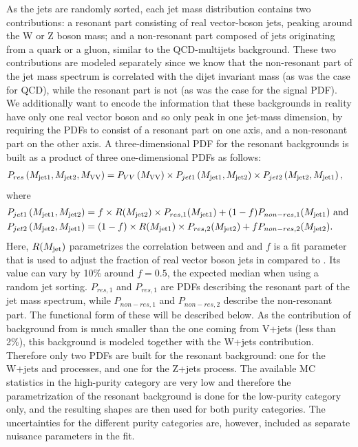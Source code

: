 As the jets are randomly sorted, each jet mass distribution contains two contributions: a resonant part consisting of real vector-boson jets, peaking around the W or Z boson mass; and a non-resonant part composed of jets originating from a quark or a gluon, similar to the QCD-multijets background. These two contributions are modeled separately since we know that the non-resonant part of the jet mass spectrum is correlated with the dijet invariant mass (as was the case for QCD), while the resonant part is not (as was the case for the signal PDF). We additionally want to encode the information that these backgrounds in reality have only one real vector boson and so only peak in one jet-mass dimension, by requiring the PDFs to consist of a resonant part on one axis, and a non-resonant part on the other axis. A three-dimensional PDF for the resonant backgrounds is built as a product of three one-dimensional PDFs as follows:
\begin{align}
	\label{eq:searchIII:vjetpdf}
	P_{res} \left(M_{\rm jet1}, M_{\rm jet2}, M_{\rm VV} \right) &= P_{VV} \left( M_{\rm VV} \right) \times  P_{jet1} \left( M_{\rm jet1}, M_{\rm jet2} \right) \times P_{jet2} \left( M_{\rm jet2}, M_{\rm jet1} \right),
\end{align}
where
\begin{align}
P_{jet1} \left( M_{\rm jet1}, M_{\rm jet2} \right) &= f \times R(M_{\rm jet2}) \times P_{res,1} ( M_{\rm jet1} ) + (1-f) P_{non-res,1} (M_{\rm jet1} )\textrm{ and } \\
P_{jet2} \left( M_{\rm jet2}, M_{\rm jet1} \right) &= (1-f) \times R(M_{\rm jet1}) \times P_{res,2} ( M_{\rm jet2} ) + f P_{non-res,2} (M_{\rm jet2} ).
\end{align}
Here, $R(M_{\rm jet})$ parametrizes the correlation between \MJO and \MJT and $f$ is a fit parameter that is used to adjust the fraction of real vector boson jets in
\MJO compared to \MJT. Its value can vary by 10\% around $f=0.5$, the expected median when using a random jet sorting. $P_{res,1}$ and $P_{res,1}$ are PDFs describing the resonant part of the jet mass spectrum, while $P_{non-res,1}$ and $P_{non-res,2}$ describe the non-resonant part. The functional form of these will be described below. \newline
As the contribution of background from \ttbar is much smaller than the one coming from V+jets (less than 2\%), this background is modeled together with the W+jets contribution. Therefore only two PDFs are built for the resonant background: one for the W+jets and \ttbar processes, and one for the Z+jets process.\newline
The available MC statistics in the high-purity category are very low and therefore the parametrization of the resonant background is done for the low-purity category only, and the resulting shapes are then used for both purity categories. The uncertainties for the different purity categories are, however, included as separate nuisance parameters in the fit.\par
